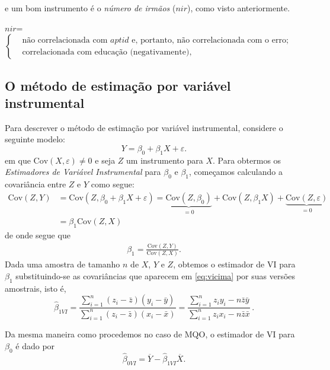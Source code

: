 \documentclass[
]{book}
\theoremstyle{definition}
\theoremstyle{definition}
\theoremstyle{definition}
\theoremstyle{remark}
\begin{document}
e um bom instrumento é o \emph{número de irmãos} (\(nir\)), como visto anteriormente.

\begin{center}
$nir$=$\begin{cases} &\mbox{não correlacionada com $aptid$ e, portanto, não  correlacionada
                                        com o erro};\\
    &\mbox{correlacionada com educação (negativamente)},
   \end{cases}$
 \end{center}

\hypertarget{o-muxe9todo-de-estimauxe7uxe3o-por-variuxe1vel-instrumental}{%
\subsection{O método de estimação por variável instrumental}\label{o-muxe9todo-de-estimauxe7uxe3o-por-variuxe1vel-instrumental}}

Para descrever o método de estimação por variável instrumental, considere o seguinte modelo:
\begin{equation}
Y=\beta_0+\beta_1 X  +\varepsilon.
\label{eq:vi1}
\end{equation}
em que \(\mbox{Cov}(X,\varepsilon)\neq0\) e seja \(Z\) um instrumento para \(X\). Para obtermos os \emph{Estimadores de Variável Instrumental} para \(\beta_0\) e \(\beta_1\), começamos calculando a covariância entre \(Z\) e \(Y\) como segue:
\begin{align*}
\mbox{Cov}(Z,Y)&=\mbox{Cov}(Z,\beta_0+\beta_1 X  +\varepsilon)=\underbrace{\mbox{Cov}(Z,\beta_0)}_{=0}+\mbox{Cov}(Z,\beta_1 X)  +\underbrace{\mbox{Cov}(Z,\varepsilon)}_{=0}\\
&=\beta_1\mbox{Cov}(Z,X)
\end{align*}
de onde segue que
\begin{align}
\beta_1=\frac{\mbox{Cov}(Z,Y)}{\mbox{Cov}(Z,X)}.
\label{eq:vicima}
\end{align}
Dada uma amostra de tamanho \(n\) de \(X\), \(Y\) e \(Z\), obtemos o estimador de VI para \(\beta_1\) substituindo-se as covariâncias que aparecem em \eqref{eq:vicima} por suas versões amostrais, isto é,
\[\hat\beta_{1VI}=\frac{\sum_{i=1}^n(z_i-\bar{z})(y_i-\bar{y})}{\sum_{i=1}^n(z_i-\bar{z})(x_i-\bar{x})} =\frac{\sum_{i=1}^nz_iy_i-n\bar{z}\bar{y}}{\sum_{i=1}^nz_ix_i-n\bar{z}\bar{x}}\,.\]

Da mesma maneira como procedemos no caso de MQO, o estimador de VI para \(\beta_0\) é dado por
\[ \hat{\beta}_{0VI}=\overline{Y}-\hat{\beta}_{1VI}\overline{X}.\]
\end{document}
